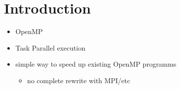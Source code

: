 \hypertarget{introduction}{%
\section{Introduction}\label{introduction}}

\begin{itemize}
\item
  OpenMP
\item
  Task Parallel execution
\item
  simple way to speed up existing OpenMP programms

  \begin{itemize}
  \item
    no complete rewrite with MPI/etc
  \end{itemize}
\end{itemize}
